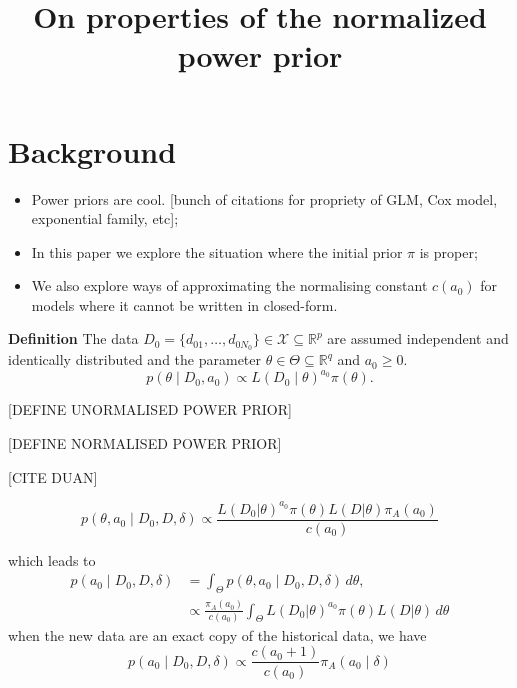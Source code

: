 \documentclass[a4paper, notitlepage, 11pt]{article}
\title{\vspace{-9ex}\centering \bf On properties of the normalized power prior}
\author{
}
\begin{document}
\maketitle

% 

\section{Background}

\begin{itemize}
 \item Power priors are cool. [bunch of citations for propriety of GLM, Cox model, exponential family, etc];
 \item In this paper we explore the situation where the initial prior $\pi$ is proper;
 \item We also explore ways of approximating the normalising constant $c(a_0)$ for models where it cannot be written in closed-form. 
\end{itemize}

\textbf{Definition}
The data $D_0 = \{ d_{01}, \ldots, d_{0N_0} \} \in \mathcal{X} \subseteq \mathbb{R}^p$ are assumed independent and identically distributed  and the parameter $\theta \in \Theta \subseteq \mathbb{R}^q$ and $a_0 \geq 0$.
\begin{equation}
\label{eq:power_prior}
 p(\theta \mid D_0, a_0) \propto L(D_0 \mid \theta)^{a_0}\pi(\theta).
\end{equation}

[DEFINE UNORMALISED POWER PRIOR]

[DEFINE NORMALISED POWER PRIOR]

[CITE DUAN] 

\begin{equation}
 \label{eq:joint_a0}
 p(\theta, a_0 \mid D_0, D, \delta) \propto \frac{L(D_0| \theta)^{a_0} \pi(\theta) L(D | \theta) \pi_A(a_0)}{c(a_0)} 
\end{equation}

which leads to 
\begin{align}
 \nonumber
   p(a_0 \mid D_0, D, \delta)  &= \int_{\Theta}  p(\theta, a_0 \mid D_0, D, \delta) \, d\theta,\\
  \label{eq:marginal_posterior_a0}
  & \propto \frac{\pi_A(a_0)}{c(a_0)} \int_{\Theta}  L(D_0| \theta)^{a_0} \pi(\theta) L(D | \theta) \, d\theta
\end{align}
when the new data are an exact copy of the historical data, we have
$$  p(a_0 \mid D_0, D, \delta) \propto \frac{c(a_0 + 1)}{c(a_0)} \pi_A(a_0 \mid \delta) $$
\end{document}
